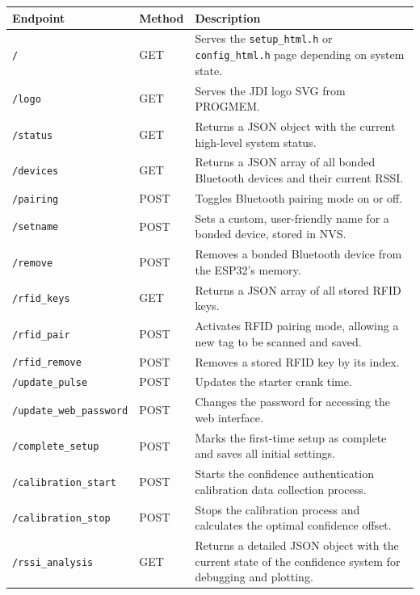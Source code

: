 \documentclass{article}
\begin{document}
\begin{center}
\begin{longtable}{|l|l|p{}|}
\hline
\textbf{Endpoint} & \textbf{Method} & \textbf{Description} \\
\hline
\endhead
\texttt{/} & GET & Serves the \texttt{setup\_html.h} or \texttt{config\_html.h} page depending on system state. \\
\hline
\texttt{/logo} & GET & Serves the JDI logo SVG from PROGMEM. \\
\hline
\texttt{/status} & GET & Returns a JSON object with the current high-level system status. \\
\hline
\texttt{/devices} & GET & Returns a JSON array of all bonded Bluetooth devices and their current RSSI. \\
\hline
\texttt{/pairing} & POST & Toggles Bluetooth pairing mode on or off. \\
\hline
\texttt{/setname} & POST & Sets a custom, user-friendly name for a bonded device, stored in NVS. \\
\hline
\texttt{/remove} & POST & Removes a bonded Bluetooth device from the ESP32's memory. \\
\hline
\texttt{/rfid\_keys} & GET & Returns a JSON array of all stored RFID keys. \\
\hline
\texttt{/rfid\_pair} & POST & Activates RFID pairing mode, allowing a new tag to be scanned and saved. \\
\hline
\texttt{/rfid\_remove} & POST & Removes a stored RFID key by its index. \\
\hline
\texttt{/update\_pulse} & POST & Updates the starter crank time. \\
\hline
\texttt{/update\_web\_password} & POST & Changes the password for accessing the web interface. \\
\hline
\texttt{/complete\_setup} & POST & Marks the first-time setup as complete and saves all initial settings. \\
\hline
\texttt{/calibration\_start} & POST & Starts the confidence authentication calibration data collection process. \\
\hline
\texttt{/calibration\_stop} & POST & Stops the calibration process and calculates the optimal confidence offset. \\
\hline
\texttt{/rssi\_analysis} & GET & Returns a detailed JSON object with the current state of the confidence system for debugging and plotting. \\
\hline
\end{longtable}
\end{center}
\end{document}
